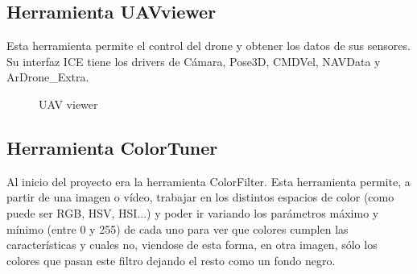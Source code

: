 \subsection{Herramienta UAVviewer}
\hspace{1 cm} Esta herramienta permite el control del drone y obtener los datos de sus sensores. Su interfaz ICE tiene los drivers de C\'amara, Pose3D, CMDVel, NAVData y ArDrone\_Extra. 

\begin{figure}[H]
 \centering
 \caption{UAV viewer}
 \label{f:UAVViewerTotal}
\end{figure} 


\subsection{Herramienta ColorTuner}
\hspace{1 cm} Al inicio del proyecto era la herramienta ColorFilter. Esta herramienta permite, a partir de una imagen o v\'ideo, trabajar en los distintos espacios de color (como puede ser RGB, HSV, HSI...) y poder ir variando los par\'ametros m\'aximo y m\'inimo (entre 0 y 255) de cada uno para ver que colores cumplen las caracter\'isticas y cuales no, viendose de esta forma, en otra imagen, s\'olo los colores que pasan este filtro dejando el resto como un fondo negro. 

